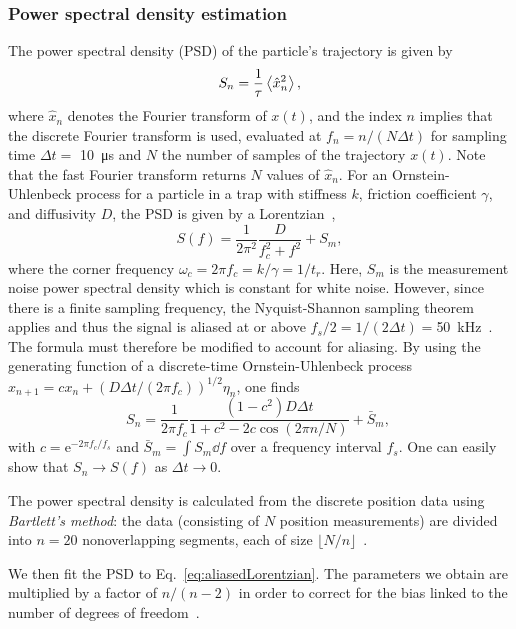 \documentclass[hyperref={colorlinks=true, urlcolor=blue, citecolor=blue, final, bound}]{sfuthesis}
\newcommand{\e}{\mathrm{e}}
\begin{document}
\subsubsection{Power spectral density estimation}
The power spectral density (PSD) of the particle's trajectory is given by
\begin{equation}
    S_n = \frac 1\tau\ev{\hat x_n^2},
\end{equation}
where $\hat x_n$ denotes the Fourier transform of $x(t)$, and the index $n$ implies that the discrete Fourier transform is used, evaluated at $f_n=n/(N\Delta t)$ for sampling time $\Delta t=$ \qty{10}{\micro\second} and $N$ the number of samples of the trajectory $x(t)$. Note that the fast Fourier transform returns $N$ values of $\hat x_n$. For an Ornstein-Uhlenbeck process for a particle in a trap with stiffness $k$, friction coefficient $\gamma$, and diffusivity $D$, the PSD is given by a Lorentzian~\cite{BergSoerensen2004},
\begin{equation}
    S(f) = \frac 1{2\pi^2}\frac{D}{f_c^2+f^2} + S_m,
\end{equation}
where the corner frequency $\omega_c = 2\pi f_c= k/\gamma = 1/t_r$. Here, $S_m$ is the measurement noise power spectral density which is constant for white noise. However, since there is a finite sampling frequency, the Nyquist-Shannon sampling theorem applies and thus the signal is aliased at or above $f_s/2 = 1/(2\Delta t) = $\qty{50}{\kilo\hertz}~\cite{Press2007}. The formula must therefore be modified to account for aliasing. By using the generating function of a discrete-time Ornstein-Uhlenbeck process $x_{n+1}=cx_n+(D\Delta t/(2\pi f_c))^{1/2}\eta_n$, one finds~\cite{BergSoerensen2004}
\begin{equation}
    S_n = \frac 1{2\pi f_c}\frac{(1-c^2)D\Delta t}{1+c^2 - 2c\cos(2\pi n/N)} + \bar S_m,~\label{eq:aliasedLorentzian}
\end{equation}
with $c=\e^{-2\pi f_c/f_s}$ and $\bar S_m = \int S_m\dd{f}$ over a frequency interval $f_s$. One can easily show that $S_n\rightarrow S(f)$ as $\Delta t\rightarrow 0$.

The power spectral density is calculated from the discrete position data using \textit{Bartlett's method}: the data (consisting of $N$ position measurements) are divided into $n=20$ nonoverlapping segments, each of size $\lfloor N/n\rfloor$~\cite{Press2007}. 

We then fit the PSD to Eq.~\ref{eq:aliasedLorentzian}. The parameters we obtain are multiplied by a factor of $n/(n-2)$ in order to correct for the bias linked to the number of degrees of freedom~\cite{BergSoerensen2004}. 
\end{document}
